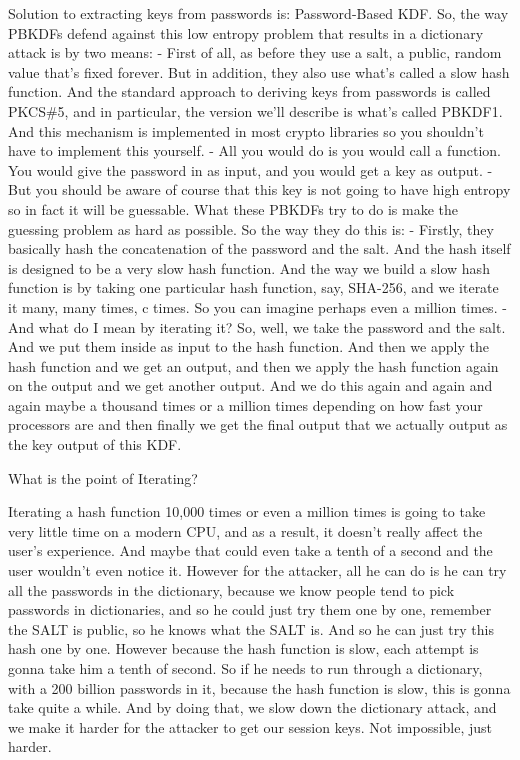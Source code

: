 \documentclass[11pt]{article}
\begin{document}
Solution to extracting keys from passwords is: Password-Based KDF. So,
the way PBKDFs defend against this low entropy problem that results in a
dictionary attack is by two means: - First of all, as before they use a
salt, a public, random value that's fixed forever. But in addition, they
also use what's called a slow hash function. And the standard approach
to deriving keys from passwords is called PKCS\#5, and in particular,
the version we'll describe is what's called PBKDF1. And this mechanism
is implemented in most crypto libraries so you shouldn't have to
implement this yourself. - All you would do is you would call a
function. You would give the password in as input, and you would get a
key as output. - But you should be aware of course that this key is not
going to have high entropy so in fact it will be guessable. What these
PBKDFs try to do is make the guessing problem as hard as possible. So
the way they do this is: - Firstly, they basically hash the
concatenation of the password and the salt. And the hash itself is
designed to be a very slow hash function. And the way we build a slow
hash function is by taking one particular hash function, say, SHA-256,
and we iterate it many, many times, c times. So you can imagine perhaps
even a million times. - And what do I mean by iterating it? So, well, we
take the password and the salt. And we put them inside as input to the
hash function. And then we apply the hash function and we get an output,
and then we apply the hash function again on the output and we get
another output. And we do this again and again and again maybe a
thousand times or a million times depending on how fast your processors
are and then finally we get the final output that we actually output as
the key output of this KDF.

What is the point of Iterating?

Iterating a hash function 10,000 times or even a million times is going
to take very little time on a modern CPU, and as a result, it doesn't
really affect the user's experience. And maybe that could even take a
tenth of a second and the user wouldn't even notice it. However for the
attacker, all he can do is he can try all the passwords in the
dictionary, because we know people tend to pick passwords in
dictionaries, and so he could just try them one by one, remember the
SALT is public, so he knows what the SALT is. And so he can just try
this hash one by one. However because the hash function is slow, each
attempt is gonna take him a tenth of second. So if he needs to run
through a dictionary, with a 200 billion passwords in it, because the
hash function is slow, this is gonna take quite a while. And by doing
that, we slow down the dictionary attack, and we make it harder for the
attacker to get our session keys. Not impossible, just harder.
\end{document}

